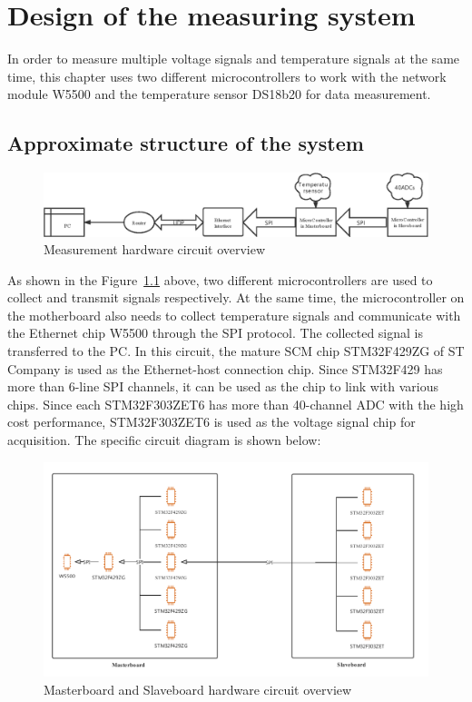 \chapter{Design of the measuring system}
\label{chap:Design of the measuring system}
In order to measure multiple voltage signals and temperature signals at the same time, this chapter uses two different microcontrollers to work with the network module W5500 and the temperature sensor DS18b20 for data measurement.
\\

\section{Approximate structure of the system}
\label{sec:Approximate structure of the system}

\begin{figure}[!ht]
	\centering
	\includegraphics[width=15cm]{grafiken/4.1.eps}
	\caption{Measurement hardware circuit overview} 
	\label{fig:4.1}
\end{figure}
\FloatBarrier
As shown in the Figure~\ref{fig:4.1} above, two different microcontrollers are used to collect and transmit signals respectively. At the same time, the microcontroller on the motherboard also needs to collect temperature signals and communicate with the Ethernet chip W5500 through the SPI protocol. The collected signal is transferred to the PC.
In this circuit, the mature SCM chip STM32F429ZG of ST Company is used as the Ethernet-host connection chip. Since STM32F429 has more than 6-line SPI channels, it can be used as the chip to link with various chips. Since each STM32F303ZET6 has more than 40-channel ADC with the high cost performance, STM32F303ZET6 is used as the voltage signal chip for acquisition. 
The specific circuit diagram is shown below: 

\begin{figure}[!ht]
	\centering
	\includegraphics[width=15cm]{grafiken/4.2.pdf}
	\caption{Masterboard and Slaveboard hardware circuit overview} 
	\label{fig:4.2}
\end{figure}
\FloatBarrier

